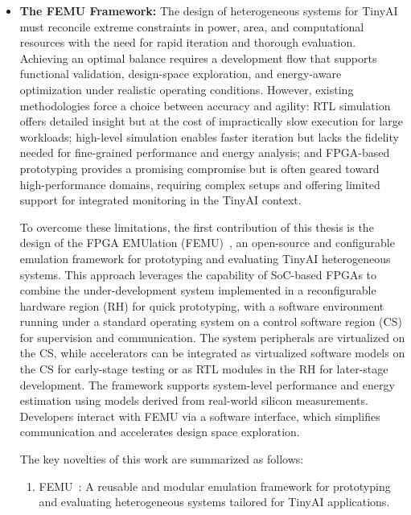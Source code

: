         \begin{itemize}
            \item \textbf{The FEMU Framework:} The design of heterogeneous systems for TinyAI must reconcile extreme constraints in power, area, and computational resources with the need for rapid iteration and thorough evaluation. Achieving an optimal balance requires a development flow that supports functional validation, design-space exploration, and energy-aware optimization under realistic operating conditions. However, existing methodologies force a choice between accuracy and agility: RTL simulation offers detailed insight but at the cost of impractically slow execution for large workloads; high-level simulation enables faster iteration but lacks the fidelity needed for fine-grained performance and energy analysis; and FPGA-based prototyping provides a promising compromise but is often geared toward high-performance domains, requiring complex setups and offering limited support for integrated monitoring in the TinyAI context.
            
            To overcome these limitations, the first contribution of this thesis is the design of the FPGA EMUlation (FEMU)~\cite{femu}, an open-source and configurable emulation framework for prototyping and evaluating TinyAI heterogeneous systems. This approach leverages the capability of SoC-based FPGAs to combine the under-development system implemented in a reconfigurable hardware region (RH) for quick prototyping, with a software environment running under a standard operating system on a control software region (CS) for supervision and communication. The system peripherals are virtualized on the CS, while accelerators can be integrated as virtualized software models on the CS for early-stage testing or as RTL modules in the RH for later-stage development. The framework supports system-level performance and energy estimation using models derived from real-world silicon measurements. Developers interact with \mbox{FEMU} via a software interface, which simplifies communication and accelerates design space exploration.
        
            The key novelties of this work are summarized as follows:
        
            \begin{enumerate}[label=(\alph*)]
                \item \mbox{FEMU}~\cite{femu}: A reusable and modular emulation framework for prototyping and evaluating heterogeneous systems tailored for TinyAI applications.
        

\end{enumerate}
\end{itemize}
